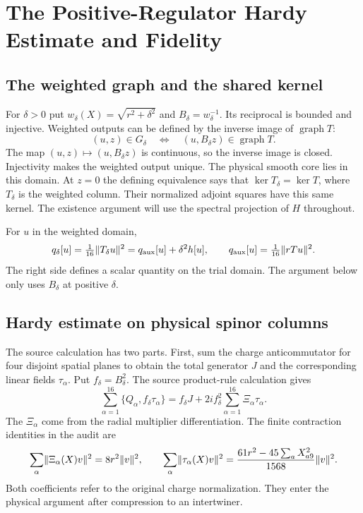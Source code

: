 \chapter{The Positive-Regulator Hardy Estimate and Fidelity}\label{ch:fidelity}

\section{The weighted graph and the shared kernel}
For $\delta>0$ put $w_\delta(X)=\sqrt{r^2+\delta^2}$ and $B_\delta=w_\delta^{-1}$. Its reciprocal is bounded and injective. Weighted outputs can be defined by the inverse image of $\operatorname{graph} T$:
\[
 (u,z)\in G_\delta\quad\Longleftrightarrow\quad (u,B_\delta z)\in
 \operatorname{graph} T .
\]
The map $(u,z)\mapsto(u,B_\delta z)$ is continuous, so the inverse image is closed. Injectivity makes the weighted output unique. The physical smooth core lies in this domain. At $z=0$ the defining equivalence says that $\ker T_\delta=\ker T$, where $T_\delta$ is the weighted column. Their normalized adjoint squares have this same kernel. The existence argument will use the spectral projection of $H$ throughout.

For $u$ in the weighted domain,
\[
 q_\delta[u]=\tfrac1{16}\lVert T_\delta u\rVert^2
 =q_{\rm aux}[u]+\delta^2 h[u],\qquad
 q_{\rm aux}[u]=\tfrac1{16}\lVert rTu\rVert^2 .
\]
The right side defines a scalar quantity on the trial domain. The argument below only uses $B_\delta$ at positive $\delta$.

\section{Hardy estimate on physical spinor columns}
The source calculation has two parts. First, sum the charge anticommutator for four disjoint spatial planes to obtain the total generator $J$ and the corresponding linear fields $\tau_\alpha$. Put $f_\delta=B_\delta^2$. The source product-rule calculation gives
\begin{equation}
 \sum_{\alpha=1}^{16}\{Q_\alpha,f_\delta\tau_\alpha\}
 = f_\delta J+2i f_\delta^2\sum_{\alpha=1}^{16}\Xi_\alpha\tau_\alpha .
 \label{eq:anticomm}
\end{equation}
The $\Xi_\alpha$ come from the radial multiplier differentiation. The finite contraction identities in the audit are
\[
 \sum_\alpha\lVert \Xi_\alpha(X)v\rVert^2=8r^2\lVert v\rVert^2,\qquad
 \sum_\alpha\lVert \tau_\alpha(X)v\rVert^2
   =\frac{61r^2-45\sum_a X_{a9}^2}{1568}\lVert v\rVert^2 .
\]
Both coefficients refer to the original charge normalization. They enter the physical argument after compression to an intertwiner.

